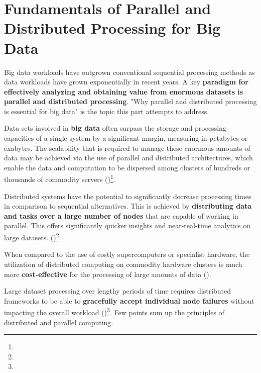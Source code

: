 \section{Fundamentals of Parallel and Distributed Processing for Big Data}

Big data workloads have outgrown conventional sequential processing methods as data workloads have grown exponentially in recent years. A key \textbf{paradigm for effectively analyzing and obtaining value from enormous datasets is parallel and distributed processing}. "Why parallel and distributed processing is essential for big data" is the topic this part attempts to address.

Data sets involved in \textbf{big data} often surpass the storage and processing capacities of a single system by a significant margin, measuring in petabytes or exabytes. The scalability that is required to manage these enormous amounts of data may be achieved via the use of parallel and distributed architectures, which enable the data and computation to be dispersed among clusters of hundreds or thousands of commodity servers (\cite{Fadiya2018TheIO})\footnote[28]{}.

Distributed systems have the potential to significantly decrease processing times in comparison to sequential alternatives. This is achieved by \textbf{distributing data and tasks over a large number of nodes} that are capable of working in parallel. This offers significantly quicker insights and near-real-time analytics on large datasets. (\cite{Natesan2023ADF})\footnote[27]{}.

When compared to the use of costly supercomputers or specialist hardware, the utilization of distributed computing on commodity hardware clusters is much more \textbf{cost-effective} for the processing of large amounts of data (\cite{Fadiya2018TheIO})\footnotemark[28].

Large dataset processing over lengthy periods of time requires distributed frameworks to be able to \textbf{gracefully accept individual node failures} without impacting the overall workload (\cite{Wingerath2016RealtimeSP})\footnote[29]{}. Few points sum up the principles of distributed and parallel computing.

